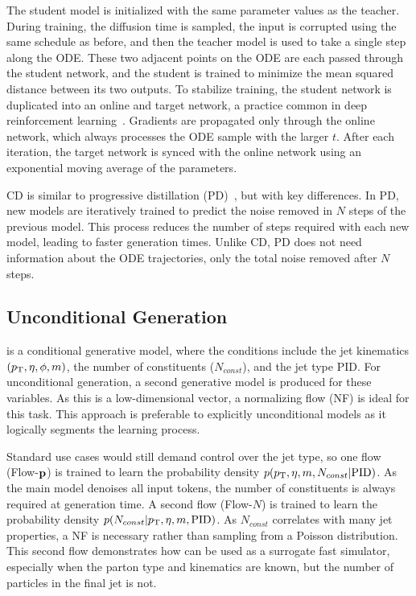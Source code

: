 The student model is initialized with the same parameter values as the teacher.
During training, the diffusion time is sampled, the input is corrupted using the same schedule as before, and then the teacher model is used to take a single step along the ODE.
These two adjacent points on the ODE are each passed through the student network, and the student is trained to minimize the mean squared distance between its two outputs.
To stabilize training, the student network is duplicated into an online and target network, a practice common in deep reinforcement learning~\cite{PlayingAtariDeep, ContinuousControlDeep, ImplicitQuantileNetworks}.
Gradients are propagated only through the online network, which always processes the ODE sample with the larger $t$.
After each iteration, the target network is synced with the online network using an exponential moving average of the parameters.

CD is similar to progressive distillation (PD)~\cite{ProgressiveDistillationFast}, but with key differences.
In PD, new models are iteratively trained to predict the noise removed in $N$ steps of the previous model.
This process reduces the number of steps required with each new model, leading to faster generation times.
Unlike CD, PD does not need information about the ODE trajectories, only the total noise removed after $N$ steps.

\subsection{Unconditional Generation}

\pcdroid is a conditional generative model, where the conditions include the jet kinematics $(p_\mathrm{T}, \eta, \phi, m)$, the number of constituents ($N_{const}$), and the jet type PID.
For unconditional generation, a second generative model is produced for these variables.
As this is a low-dimensional vector, a normalizing flow (NF) is ideal for this task.
This approach is preferable to explicitly unconditional models as it logically segments the learning process.

Standard use cases would still demand control over the jet type, so
one flow (Flow-$\mathbf{p}$) is trained to learn the probability density $p(p_\mathrm{T}, \eta, m, N_{const} |\textrm{PID})$.
As the main model denoises all input tokens, the number of constituents is always required at generation time.
A second flow (Flow-$N$) is trained to learn the probability density $p(N_{const}|p_\mathrm{T}, \eta, m, \textrm{PID})$.
As $N_{const}$ correlates with many jet properties, a NF is necessary rather than sampling from a Poisson distribution.
This second flow demonstrates how \pcdroid can be used as a surrogate fast simulator, especially when the parton type and kinematics are known, but the number of particles in the final jet is not.

